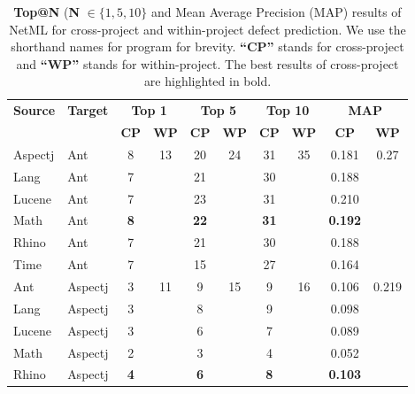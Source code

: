\begin{table*}[t!]
  \centering
  \caption{\textbf{Top@N} (\textbf{N} $\in {\{1, 5, 10\}}$ and Mean Average Precision (MAP) results of NetML for cross-project and within-project defect prediction. We use the shorthand names for program for brevity. \textbf{``CP''} stands for cross-project and \textbf{``WP''} stands for within-project. The best results of cross-project are highlighted in bold. }
    \begin{tabular}{|l|l|c|c|c|c|c|c|c|c|}
    \hline
    \multicolumn{1}{|c|}{\multirow{2}[4]{*}{\textbf{Source}}} & \multicolumn{1}{c|}{\multirow{2}[4]{*}{\textbf{Target}}} & \multicolumn{2}{c|}{\textbf{Top 1}} & \multicolumn{2}{c|}{\textbf{Top 5}} & \multicolumn{2}{c|}{\textbf{Top 10}} & \multicolumn{2}{c|}{\textbf{MAP}} \\
\cline{3-10}          &       & \textbf{CP} & \textbf{WP} & \textbf{CP} & \textbf{WP} & \textbf{CP} & \textbf{WP} & \textbf{CP} & \textbf{WP} \\
    \hline
    \hline
    Aspectj & Ant   & 8     & \multirow{6}[2]{*}{13} & 20    & \multirow{6}[2]{*}{24} & 31    & \multirow{6}[2]{*}{35} & 0.181 & \multirow{6}[2]{*}{0.27} \\
    Lang  & Ant   & 7     &       & 21    &       & 30    &       & 0.188 &  \\
    Lucene & Ant   & 7     &       & 23    &       & 31    &       & 0.210  &  \\
    Math  & Ant   & \textbf{8}     &       & \textbf{22}    &       & \textbf{31}    &       & \textbf{0.192} &  \\
    Rhino & Ant   & 7     &       & 21    &       & 30    &       & 0.188 &  \\
    Time  & Ant   & 7     &       & 15    &       & 27    &       & 0.164 &  \\
    \hline
    Ant   & Aspectj & 3     & \multirow{6}[2]{*}{11} & 9     & \multirow{6}[2]{*}{15} & 9     & \multirow{6}[2]{*}{16} & 0.106 & \multirow{6}[2]{*}{0.219} \\
    Lang  & Aspectj & 3     &       & 8     &       & 9     &       & 0.098 &  \\
    Lucene  & Aspectj & 3     &       & 6     &       & 7     &       & 0.089 &  \\
    Math  & Aspectj & 2     &       & 3     &       & 4     &       & 0.052 &  \\
    Rhino & Aspectj & \textbf{4}     &       & \textbf{6}     &       & \textbf{8}     &       & \textbf{0.103} &  \\

\end{tabular}
\end{table*}
